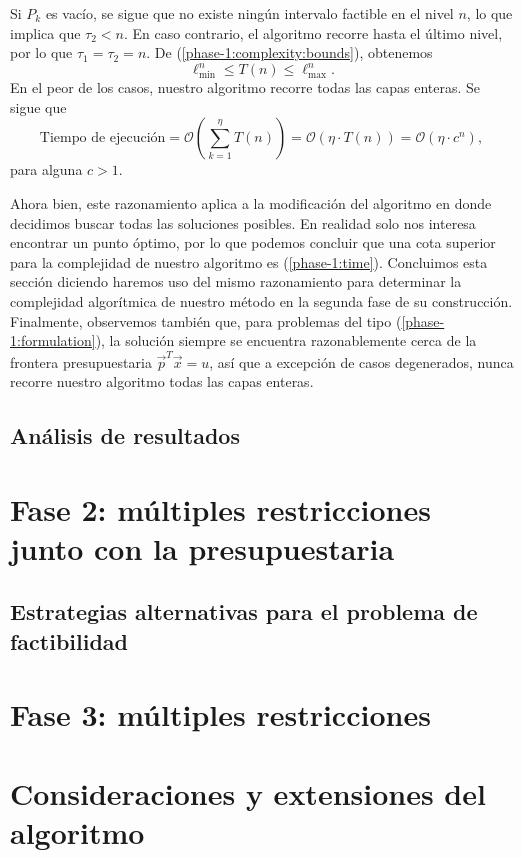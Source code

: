 Si $P_k$ es vacío, se sigue que no existe ningún intervalo factible en el nivel $n$, lo que implica
que $\tau_2 < n$. En caso contrario, el algoritmo recorre hasta el último nivel, por lo que $\tau_1
= \tau_2 = n$. De (\ref{phase-1:complexity:bounds}), obtenemos
\begin{equation}
	\ell_{\min}^{n} \leq T(n) \leq \ell_{\max}^{n}.
\end{equation}
En el peor de los casos, nuestro algoritmo recorre todas las capas enteras. Se sigue que
\begin{equation}
	\label{phase-1:time}
	\text{Tiempo de ejecución}
	= \mathcal{O} \left(\sum_{k=1}^{\eta} T(n) \right)
	= \mathcal{O}(\eta \cdot T(n))
	= \mathcal{O}(\eta \cdot c^{n}),
\end{equation}
para alguna $c > 1$.

Ahora bien, este razonamiento aplica a la modificación del algoritmo en donde decidimos buscar todas
las soluciones posibles. En realidad solo nos interesa encontrar un punto óptimo, por lo que podemos
concluir que una cota superior para la complejidad de nuestro algoritmo es (\ref{phase-1:time}).
Concluimos esta sección diciendo haremos uso del mismo razonamiento para determinar la complejidad
algorítmica de nuestro método en la segunda fase de su construcción. Finalmente, observemos también
que, para problemas del tipo (\ref{phase-1:formulation}), la solución siempre se encuentra
razonablemente cerca de la frontera presupuestaria $\vec{p}^T\vec{x} = u$, así que a excepción de
casos degenerados, nunca recorre nuestro algoritmo todas las capas enteras.

\subsection{Análisis de resultados}

\section{Fase 2: múltiples restricciones junto con la presupuestaria}
\subsection{Estrategias alternativas para el problema de factibilidad}
\section{Fase 3: múltiples restricciones}
\section{Consideraciones y extensiones del algoritmo}
